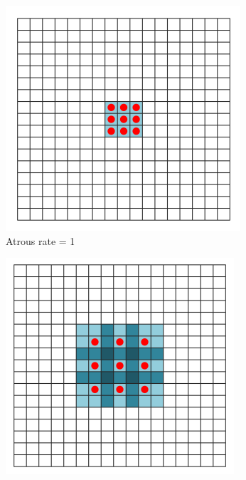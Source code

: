 	\begin{figure}
		\begin{subfigure}{.3\textwidth}
			\centering
			\includegraphics[width=1.03\linewidth]{images/r_1}
			\caption{Atrous rate = 1}
		\end{subfigure}
		\begin{subfigure}{.3\textwidth}
			\centering
			\includegraphics[width=1\linewidth]{images/r_2}

\end{subfigure}
\end{figure}
